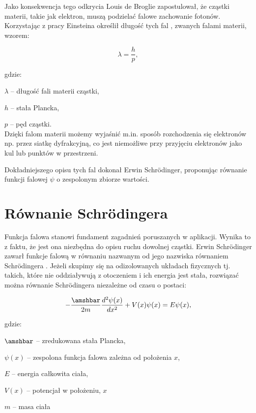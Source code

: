\documentclass{SGGW-thesis}
\begin{document}
	 Jako konsekwencja tego odkrycia Louis de Broglie zapostulował, że cząstki materii, takie jak elektron, muszą podzielać falowe zachowanie fotonów. Korzystając z pracy Einsteina określił długość tych fal \cite{matter-wave}, zwanych falami materii, wzorem:
	 
	 \begin{equation}
	 \lambda=\frac{h}{p},
	 \end{equation}
	
	 
	 gdzie:
	 
	 $\lambda$ -- długość fali materii cząstki,
	 
	 $h$ -- stała Plancka,
	 
	 $p$ -- pęd cząstki.\\
	 
	 Dzięki falom materii możemy wyjaśnić m.in. sposób rozchodzenia się elektronów np. przez siatkę dyfrakcyjną, co jest niemożliwe przy przyjęciu elektronów jako kul lub punktów w przestrzeni.
	 
	 Dokładniejszego opisu tych fal dokonał Erwin Schrödinger, proponując równanie funkcji falowej $\psi$ o zespolonym zbiorze wartości. 
	 
	\section{Równanie Schrödingera}
	Funkcja falowa stanowi fundament zagadnień poruszanych w aplikacji. Wynika to z faktu, że jest ona niezbędna do opisu ruchu dowolnej cząstki. Erwin Schrödinger zawarł funkcje falową w równaniu nazwanym od jego nazwiska równaniem Schrödingera \cite{schrodinger-equation}.  Jeżeli skupimy się na odizolowanych układach fizycznych tj. takich, które nie oddziaływują z otoczeniem i ich energia jest stała, rozwiązać można równanie Schrödingera niezależne od czasu o postaci:
	\begin{center}
	\begin{equation}
		-\frac{\amshbar}{2m} \frac{d^2\psi(x)}{dx^2} + V(x)\psi(x) = E\psi(x),
	\end{equation}
	\end{center}
	gdzie:
	
	$\amshbar$ -- zredukowana stała Plancka,
	
	$\psi(x)$ -- zespolona funkcja falowa zależna od położenia $x$,
	
	$E$ -- energia całkowita ciała,
	
	$V(x)$ -- potencjał w położeniu, $x$
	
	$m$ -- masa ciała\\
	
\end{document}
